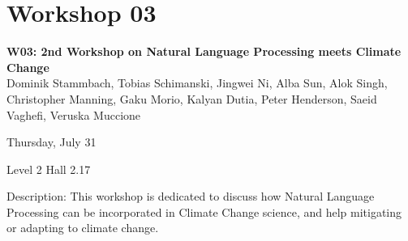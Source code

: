 \clearpage



\section[W03: 2nd Workshop on Natural Language Processing meets Climate Change]{Workshop 03}
\label{workshop_3}

\begin{center}
    {\Large \textbf{W03: 2nd Workshop on Natural Language Processing meets Climate Change}}\\

    Dominik Stammbach, Tobias Schimanski, Jingwei Ni, Alba Sun, Alok Singh, Christopher Manning, Gaku Morio, Kalyan Dutia, Peter Henderson, Saeid Vaghefi, Veruska Muccione

    Thursday, July 31
    
    Level 2 Hall 2.17

\end{center}

Description: This workshop is dedicated to discuss how Natural Language Processing can be incorporated in Climate Change science, and help mitigating or adapting to climate change.


